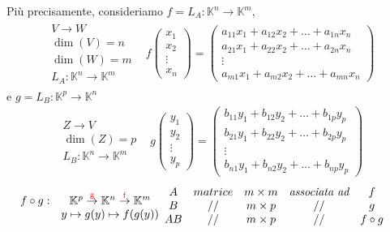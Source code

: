 Più precisamente, consideriamo $f=L_A:\mathbb{K}^n\to \mathbb{K}^m$,
\begin{eqnarray}
  \begin{matrix}
    V\to W\\
    \dim (V)=n\\
    \dim (W)=m\\
    L_A:\mathbb{K}^n\to \mathbb{K}^m
  \end{matrix} & f
                 \begin{pmatrix}
                   x_1\\
                   x_2\\
                   \vdots\\
                   x_n
                 \end{pmatrix} =
                 \begin{pmatrix}
                   a_{11}x_1+a_{12}x_2+\dots+a_{1n}x_n\\
                   a_{21}x_1+a_{22}x_2+\dots+a_{2n}x_n\\
                   \vdots\\
                   a_{m1}x_1+a_{m2}x_2+\dots+a_{mn}x_n
                 \end{pmatrix}
\end{eqnarray}
e $g=L_B:\mathbb{K}^p\to \mathbb{K}^n$
\begin{eqnarray}
  \begin{matrix}
    Z\to V\\
    \dim (Z)=p\\
    L_B:\mathbb{K}^n\to \mathbb{K}^m
  \end{matrix} & g
                 \begin{pmatrix}
                   y_1\\
                   y_2\\
                   \vdots\\
                   y_p
                 \end{pmatrix} =
                 \begin{pmatrix}
                   b_{11}y_1+b_{12}y_2+\dots+b_{1p}y_p\\
                   b_{21}y_1+b_{22}y_2+\dots+b_{2p}y_p\\
                   \vdots\\
                   b_{n1}y_1+b_{n2}y_2+\dots+b_{np}y_p
                 \end{pmatrix}
\end{eqnarray}
\begin{eqnarray*}
  \begin{matrix}
    f\circ g: & \mathbb{K}^p\stackrel{\mathrm{\color{red}g}}{\to}\mathbb{K}^n
                \stackrel{\mathrm{\color{red}f}}{\to}\mathbb{K}^m\\
    & y \mapsto g(y)\mapsto f(g(y))
  \end{matrix}
  &
    \begin{array}{cccccc}
      A & matrice & m\times m & \textit{associata ad} & f\\
      B& // & m\times p & // & g\\
      AB& // & m\times p& // &f\circ g
    \end{array}
\end{eqnarray*}

